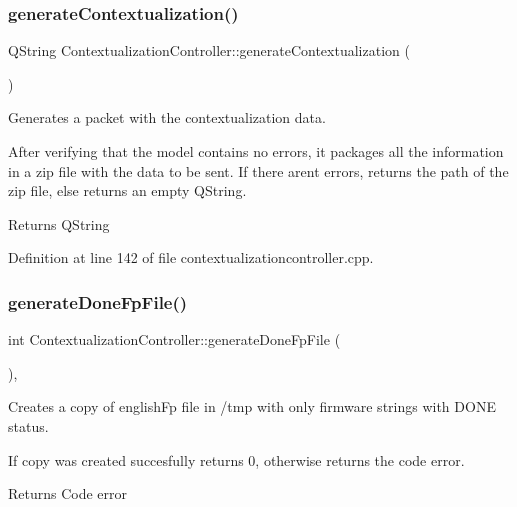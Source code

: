 \subsubsection{\texorpdfstring{generate\+Contextualization()}{generateContextualization()}}
{\footnotesize\ttfamily Q\+String Contextualization\+Controller\+::generate\+Contextualization (\begin{DoxyParamCaption}{ }\end{DoxyParamCaption})\hspace{0.3cm}{\ttfamily [protected]}}



Generates a packet with the contextualization data. 

After verifying that the model contains no errors, it packages all the information in a zip file with the data to be sent. If there aren\textquotesingle{}t errors, returns the path of the zip file, else returns an empty Q\+String. \begin{DoxyReturn}{Returns}
Q\+String 
\end{DoxyReturn}


Definition at line 142 of file contextualizationcontroller.\+cpp.

\mbox{\label{classContextualizationController_af142a8bbd561278c3423ccad3b40c910}} 
\subsubsection{\texorpdfstring{generate\+Done\+Fp\+File()}{generateDoneFpFile()}}
{\footnotesize\ttfamily int Contextualization\+Controller\+::generate\+Done\+Fp\+File (\begin{DoxyParamCaption}{ }\end{DoxyParamCaption})\hspace{0.3cm}{\ttfamily [protected]}, {\ttfamily [virtual]}}



Creates a copy of english\+Fp file in /tmp with only firmware strings with D\+O\+NE status. 

If copy was created succesfully returns 0, otherwise returns the code error. \begin{DoxyReturn}{Returns}
Code error 
\end{DoxyReturn}


